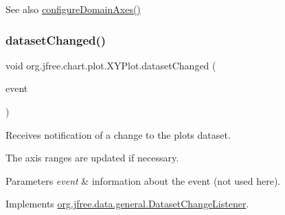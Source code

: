 \begin{DoxySeeAlso}{See also}
\mbox{\hyperlink{classorg_1_1jfree_1_1chart_1_1plot_1_1_x_y_plot_af126a8a9a86d19e7a8dbc802ba88b1df}{configure\+Domain\+Axes()}} 
\end{DoxySeeAlso}
\mbox{\label{classorg_1_1jfree_1_1chart_1_1plot_1_1_x_y_plot_a87830fd0f3fe900f044bb6e4e47bcb63}} 
\subsubsection{\texorpdfstring{dataset\+Changed()}{datasetChanged()}}
{\footnotesize\ttfamily void org.\+jfree.\+chart.\+plot.\+X\+Y\+Plot.\+dataset\+Changed (\begin{DoxyParamCaption}\item[{\mbox{\hyperlink{classorg_1_1jfree_1_1data_1_1general_1_1_dataset_change_event}{Dataset\+Change\+Event}}}]{event }\end{DoxyParamCaption})}

Receives notification of a change to the plot\textquotesingle{}s dataset. 

The axis ranges are updated if necessary.


\begin{DoxyParams}{Parameters}
{\em event} & information about the event (not used here). \\
\hline
\end{DoxyParams}


Implements \mbox{\hyperlink{interfaceorg_1_1jfree_1_1data_1_1general_1_1_dataset_change_listener_a26ca53969f0dfa539f52e846a3cd72fe}{org.\+jfree.\+data.\+general.\+Dataset\+Change\+Listener}}.

\mbox{\label{classorg_1_1jfree_1_1chart_1_1plot_1_1_x_y_plot_a4527611089d47dba8e48dd6a5bb88cdc}} 
